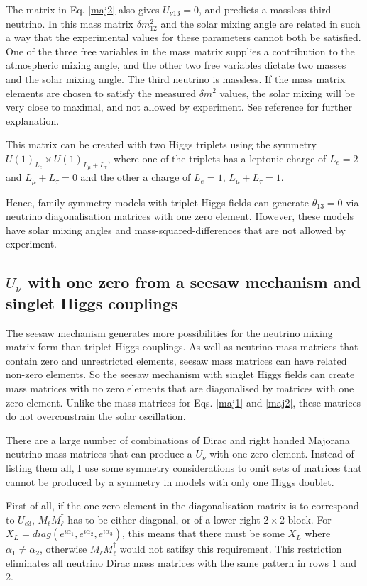\documentclass[nofootinbib,showpacs]{revtex4}
\begin{document}
The matrix in Eq. \ref{maj2} 
also gives $U_{\nu 13}=0$, and predicts a massless third neutrino. In this mass matrix $\delta m^2_{12}$ and the solar mixing angle are related in such a way that the experimental values for these parameters cannot both be satisfied. One of the three free variables in the mass matrix supplies a contribution to the atmospheric mixing angle, and the other two free variables dictate two masses and the solar mixing angle. The third neutrino is massless. If the mass matrix elements are chosen to satisfy the measured $\delta m^2$ values, the solar mixing will be very close to maximal, and not allowed by experiment. See reference \cite{nogo2} for further explanation.  

This matrix can be created with two Higgs triplets using the symmetry $U(1)_{L_e}\times U(1)_{L_\mu+L_\tau}$, where one of the triplets has a leptonic charge of $L_e=2$ and $L_\mu+L_\tau=0$ and the other a charge of  $L_e=1$, $L_\mu+L_\tau=1$. 

Hence, family symmetry models with triplet Higgs fields can generate $\theta_{13}=0$ via neutrino diagonalisation matrices with one zero element. However, these models have solar mixing angles and mass-squared-differences that are not allowed by experiment.   


\subsection{$U_\nu$ with one zero from a seesaw mechanism and singlet Higgs couplings}\label{onezeronu}

The seesaw mechanism generates more possibilities for the neutrino mixing matrix form than triplet Higgs couplings. As well as neutrino mass matrices that contain zero and unrestricted elements, seesaw mass matrices can have related non-zero elements. So the seesaw mechanism with singlet Higgs fields can create mass matrices with no zero elements that are diagonalised by matrices with one zero element. Unlike the mass matrices for Eqs. \ref{maj1} and \ref{maj2}, these matrices do not overconstrain the solar oscillation. 

There are a large number of combinations of Dirac and right handed Majorana neutrino mass matrices that can produce a $U_\nu$ with one zero element. Instead of listing them all, I use some symmetry considerations to omit sets of matrices that cannot be produced by a symmetry in models with only one Higgs doublet. 


First of all, if the one zero element in the diagonalisation matrix is to correspond to $U_{e3}$, $M_\ell M_\ell^\dagger$ has to be either diagonal, or of a lower right 
$2\times 2$ block. For $X_L=diag(e^{i\alpha_1},e^{i\alpha_2},e^{i\alpha_3})$, this means that there must be some $X_L$ where $\alpha_1\neq\alpha_2$, otherwise $M_\ell M_\ell^\dagger$ would not satifsy this requirement. This restriction eliminates 
 all neutrino Dirac mass matrices with the same pattern in rows 1 and 2. 
\end{document}
